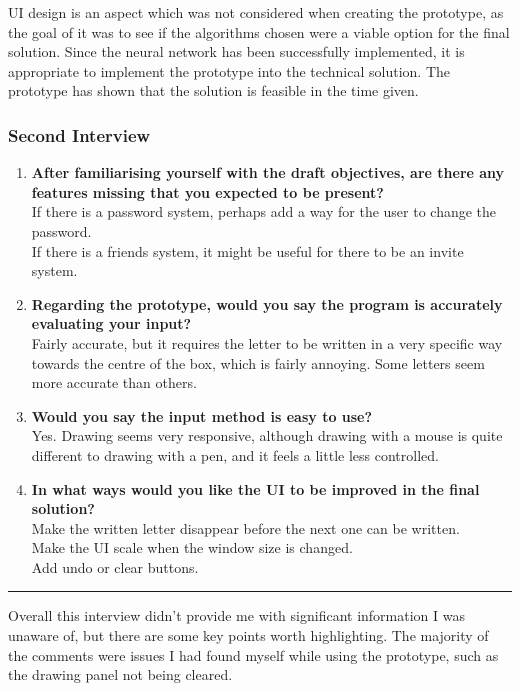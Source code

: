 \documentclass{article}
\begin{document}
UI design is an aspect which was not considered when creating the prototype, as the goal of it was to see if the algorithms chosen were a viable option for the final solution. Since the neural network has been successfully implemented, it is appropriate to implement the prototype into the technical solution. The prototype has shown that the solution is feasible in the time given.

\subsubsection{Second Interview}
\begin{enumerate}
    \item \textbf{After familiarising yourself with the draft objectives, are there any features missing that you expected to be present?} \\
    If there is a password system, perhaps add a way for the user to change the password. \\
    If there is a friends system, it might be useful for there to be an invite system.
    \item \textbf{Regarding the prototype, would you say the program is accurately evaluating your input?} \\ 
    Fairly accurate, but it requires the letter to be written in a very specific way towards the centre of the box, which is fairly annoying. Some letters seem more accurate than others.
    \item \textbf{Would you say the input method is easy to use?} \\
    Yes. Drawing seems very responsive, although drawing with a mouse is quite different to drawing with a pen, and it feels a little less controlled.
    \item \textbf{In what ways would you like the UI to be improved in the final solution?} \\
    Make the written letter disappear before the next one can be written. \\
    Make the UI scale when the window size is changed. \\
    Add undo or clear buttons.
\end{enumerate}

\begin{center}
\rule{0.5\linewidth}{0.4pt}
\end{center}

Overall this interview didn't provide me with significant information I was unaware of, but there are some key points worth highlighting. The majority of the comments were issues I had found myself while using the prototype, such as the drawing panel not being cleared. \\
\end{document}
